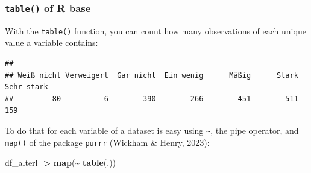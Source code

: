 \documentclass[
  doc]{apa6}
\newenvironment{Shaded}{\begin{snugshade}}{\end{snugshade}}
\newcommand{\FunctionTok}[1]{\textcolor[rgb]{0.13,0.29,0.53}{\textbf{#1}}}
\newcommand{\NormalTok}[1]{#1}
\newcommand{\SpecialCharTok}[1]{\textcolor[rgb]{0.81,0.36,0.00}{\textbf{#1}}}
\begin{document}
\hypertarget{table-of-r-base}{%
\subsubsection{\texorpdfstring{\texttt{table()} of R base}{table() of R base}}\label{table-of-r-base}}

With the \texttt{table()} function, you can count how many observations of each unique value a variable contains:

\begin{Shaded}
\end{Shaded}

\begin{verbatim}
## 
## Weiß nicht Verweigert  Gar nicht  Ein wenig      Mäßig      Stark Sehr stark 
##         80          6        390        266        451        511        159
\end{verbatim}

To do that for each variable of a dataset is easy using \texttt{\textasciitilde{}}, the pipe operator, and \texttt{map()} of the package \texttt{purrr} (Wickham \& Henry, 2023):

\begin{Shaded}
\begin{Highlighting}[]
\NormalTok{df\_alterl }\SpecialCharTok{|\textgreater{}} 
  \FunctionTok{map}\NormalTok{(}\SpecialCharTok{\textasciitilde{}} \FunctionTok{table}\NormalTok{(.))}
\end{Highlighting}
\end{Shaded}
\end{document}
